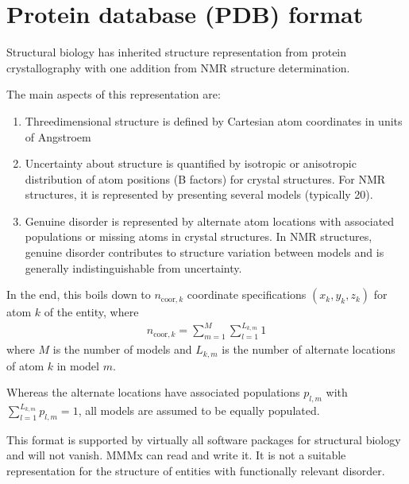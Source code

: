 \documentclass[letterpaper,10pt,english]{sphinxmanual}
\begin{document}
\section{Protein database (PDB) format}
\label{\detokenize{structure_representation:protein-database-pdb-format}}
Structural biology has inherited structure representation from protein crystallography with one addition from NMR structure determination.

The main aspects of this representation are:
\begin{enumerate}
%
\item {} 
Three\sphinxhyphen{}dimensional structure is defined by Cartesian atom coordinates in units of Angstroem

\item {} 
Uncertainty about structure is quantified by isotropic or anisotropic distribution of atom positions (B factors) for crystal structures.
For NMR structures, it is represented by presenting several models (typically 20).

\item {} 
Genuine disorder is represented by alternate atom locations with associated populations or missing atoms in crystal structures.
In NMR structures, genuine disorder contributes to structure variation between models and is generally indistinguishable from uncertainty.

\end{enumerate}

In the end, this boils down to \(n_{\mathrm{coor},k}\) coordinate specifications \((x_k,y_k,z_k)\) for atom \(k\) of the entity, where
\begin{equation*}
\begin{split}n_{\mathrm{coor},k} = \sum_{m = 1}^M \sum_{l = 1}^{L_{k,m}} 1\end{split}
\end{equation*}
where \(M\) is the number of models and \(L_{k,m}\) is the number of alternate locations of atom \(k\) in model \(m\).

Whereas the alternate locations have associated populations \(p_{l,m}\) with \(\sum_{l = 1}^{L_{k,m}} p_{l,m} = 1\), all models are assumed to be equally populated.

This format is supported by virtually all software packages for structural biology and will not vanish. MMMx can read and write it.
It is not a suitable representation for the structure of entities with functionally relevant disorder.
\end{document}
